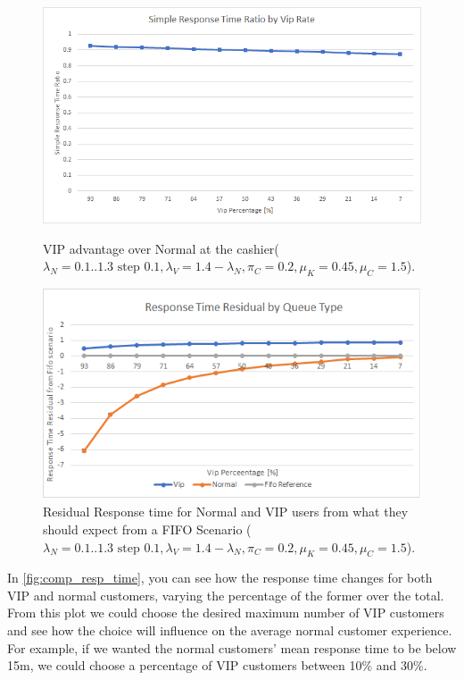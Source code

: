 \begin{figure}[h!]
  \centering
  \begin{minipage}{0.48\textwidth}
    \includegraphics[width=\textwidth]{figs/simpleResponseTimeRatio.png}
    \caption{VIP advantage over Normal at the cashier($\lambda_N={{0.1..1.3 \text{ step } 0.1}},\lambda_V=1.4-\lambda_N,\pi_C=0.2, \mu_K=0.45, \mu_C=1.5$).}
    \label{fig:simpleResponseTimeRatio}
  \end{minipage}\hspace{0.03\textwidth}
  \begin{minipage}{0.48\textwidth}
    \includegraphics[width=\textwidth]{figs/responseTimeResidualCashier.png}
    \caption{Residual Response time for Normal and VIP users from what they should expect from a FIFO Scenario ($\lambda_N={{0.1..1.3 \text{ step } 0.1}},\lambda_V=1.4-\lambda_N,\pi_C=0.2, \mu_K=0.45, \mu_C=1.5$).}
    \label{fig:residual-cashier}
  \end{minipage}
\end{figure}

In \cref{fig:comp_resp_time}, you can see how the response time changes for both VIP and normal customers, varying the percentage of the former over the total. 
From this plot we could choose the desired maximum number of VIP customers and see how the choice will influence on the average normal customer experience. For example, if we wanted the normal customers' mean response time to be below 15m, we could choose a percentage of VIP customers between 10\% and 30\%.

